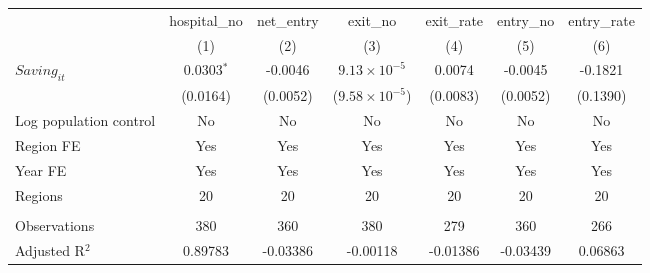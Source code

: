 \begingroup
\centering
\begin{tabular}{lcccccc}
   \toprule
                          & hospital\_no  & net\_entry  & exit\_no                & exit\_rate  & entry\_no  & entry\_rate \\    
                          & (1)           & (2)         & (3)                     & (4)         & (5)        & (6)\\  
   \midrule 
   $Saving_{it}$          & 0.0303$^{*}$  & -0.0046     & $9.13\times 10^{-5}$    & 0.0074      & -0.0045    & -0.1821\\   
                          & (0.0164)      & (0.0052)    & ($9.58\times 10^{-5}$)  & (0.0083)    & (0.0052)   & (0.1390)\\   
   Log population control & No            & No          & No                      & No          & No         & No\\  
   Region FE              & Yes           & Yes         & Yes                     & Yes         & Yes        & Yes\\  
   Year FE                & Yes           & Yes         & Yes                     & Yes         & Yes        & Yes\\  
   Regions                & 20            & 20          & 20                      & 20          & 20         & 20\\  
    \\
   Observations           & 380           & 360         & 380                     & 279         & 360        & 266\\  
   Adjusted R$^2$         & 0.89783       & -0.03386    & -0.00118                & -0.01386    & -0.03439   & 0.06863\\  
   \bottomrule
\end{tabular}
\par\endgroup

